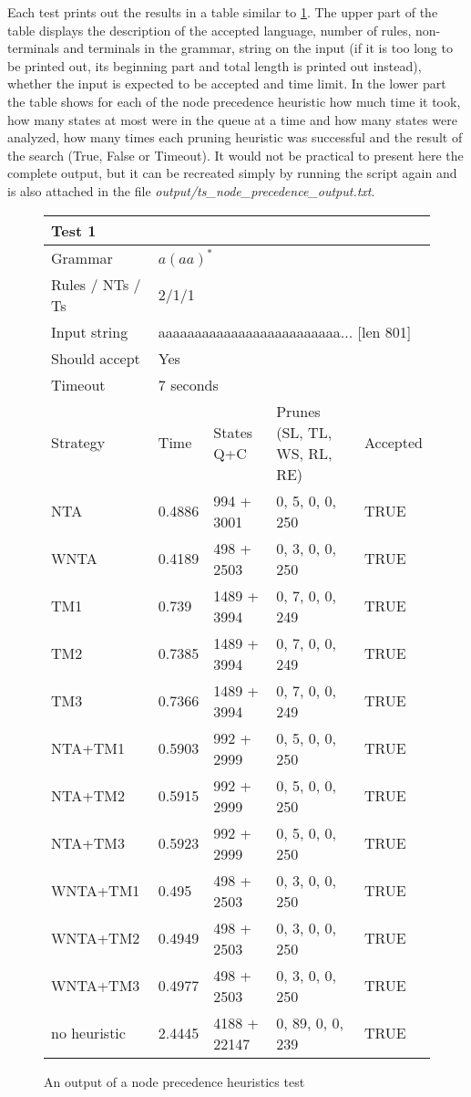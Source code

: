 Each test prints out the results in a table similar to \ref{tab:node_heuristics_table}. The upper part of the table displays the description of the accepted language, number of rules, non-terminals and terminals in the grammar, string on the input (if it is too long to be printed out, its beginning part and total length is printed out instead), whether the input is expected to be accepted and time limit. In the lower part the table shows for each of the node precedence heuristic how much time it took, how many states at most were in the queue at a time and how many states were analyzed, how many times each pruning heuristic was successful and the result of the search (True, False or Timeout). It would not be practical to present here the complete output, but it can be recreated simply by running the script again and is also attached in the file \textit{output/ts\_node\_precedence\_output.txt}.

\begin{figure}[h!]
  \caption{An output of a node precedence heuristics test}
  \label{tab:node_heuristics_table}
\begin{tabular}{ |l|l|l|l|l|  }
  \hline
  \multicolumn{5}{|l|}{Test 1} \\
  \hline
  Grammar & \multicolumn{4}{|l|}{$a(aa)^*$} \\
  Rules / NTs / Ts & \multicolumn{4}{|l|}{2/1/1} \\
  Input string & \multicolumn{4}{|l|}{aaaaaaaaaaaaaaaaaaaaaaaaa... [len 801]} \\
  Should accept & \multicolumn{4}{|l|}{Yes} \\
  Timeout & \multicolumn{4}{|l|}{7 seconds} \\
  \hline
  Strategy & Time & States Q+C & Prunes (SL, TL, WS, RL, RE)& Accepted \\
  \hline
 NTA & 0.4886 & 994 + 3001  & 0, 5, 0, 0, 250 & TRUE \\
 WNTA & 0.4189 & 498 + 2503 & 0, 3, 0, 0, 250 & TRUE  \\
 TM1 & 0.739 & 1489 + 3994 & 0, 7, 0, 0, 249  & TRUE  \\
 TM2 & 0.7385 & 1489 + 3994 & 0, 7, 0, 0, 249 & TRUE  \\
 TM3 & 0.7366 & 1489 + 3994 & 0, 7, 0, 0, 249  & TRUE  \\
 NTA+TM1 & 0.5903 & 992 + 2999 & 0, 5, 0, 0, 250 & TRUE  \\
 NTA+TM2 & 0.5915 & 992 + 2999 & 0, 5, 0, 0, 250 & TRUE  \\
 NTA+TM3 & 0.5923 & 992 + 2999 & 0, 5, 0, 0, 250 & TRUE  \\
 WNTA+TM1 & 0.495 & 498 + 2503 & 0, 3, 0, 0, 250 & TRUE  \\
 WNTA+TM2 & 0.4949 & 498 + 2503 & 0, 3, 0, 0, 250 & TRUE  \\
 WNTA+TM3 & 0.4977 & 498 + 2503 & 0, 3, 0, 0, 250 & TRUE  \\
 no heuristic & 2.4445 & 4188 + 22147 & 0, 89, 0, 0, 239 & TRUE  \\
  \hline
  \hline
\end{tabular}
\end{figure}

